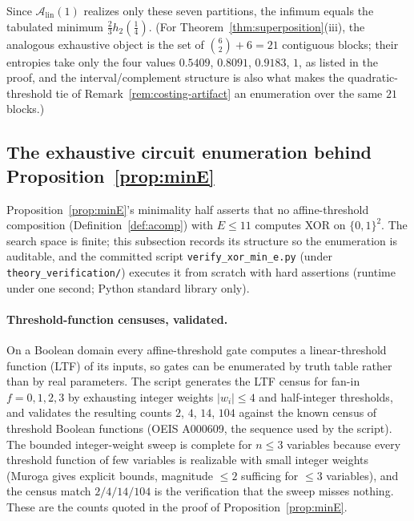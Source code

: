 \documentclass[twocolumn,10pt]{article}
\theoremstyle{definition}
\theoremstyle{remark}
\newcommand{\cA}{\mathcal{A}}
\newcommand{\Alin}{\cA_{\mathrm{lin}}}
\newcommand{\hb}{h_2}
\begin{document}
Since $\Alin(1)$ realizes only these seven partitions, the infimum equals
the tabulated minimum $\tfrac23 \hb(\tfrac14)$. (For
Theorem~\ref{thm:superposition}(iii), the analogous exhaustive object is
the set of $\binom{6}{2} + 6 = 21$ contiguous blocks; their entropies take
only the four values $0.5409$, $0.8091$, $0.9183$, $1$, as listed in the
proof, and the interval/complement structure is also what makes the
quadratic-threshold tie of Remark~\ref{rem:costing-artifact} an
enumeration over the same $21$ blocks.)

\subsection{The exhaustive circuit enumeration behind
Proposition~\ref{prop:minE}}
\label{app:enum-minE}

Proposition~\ref{prop:minE}'s minimality half asserts that no
affine-threshold composition (Definition~\ref{def:acomp}) with
$E \le 11$ computes XOR on $\{0,1\}^2$. The search space is finite; this
subsection records its structure so the enumeration is auditable, and
the committed script \texttt{verify\_xor\_min\_e.py}
(under \texttt{theory\_verification/}) executes it from scratch
with hard assertions (runtime under one second; Python
standard library only).

\paragraph{Threshold-function censuses, validated.} On a Boolean domain
every affine-threshold gate computes a linear-threshold function (LTF)
of its inputs, so gates can be enumerated by truth table rather than by
real parameters. The script generates the LTF census for fan-in
$f = 0, 1, 2, 3$ by exhausting integer weights $|w_i| \le 4$ and
half-integer thresholds, and validates the resulting counts $2$, $4$,
$14$, $104$ against the known census of threshold Boolean functions
\cite{muroga} (OEIS A000609, the sequence used by the script). The
bounded integer-weight sweep is complete for $n \le 3$ variables
because every threshold function of few variables is realizable with
small integer weights (Muroga \cite{muroga} gives explicit bounds,
magnitude $\le 2$ sufficing for $\le 3$ variables), and the census
match $2/4/14/104$ is the verification that the sweep misses nothing.
These are the counts quoted in the proof of
Proposition~\ref{prop:minE}.
\end{document}
